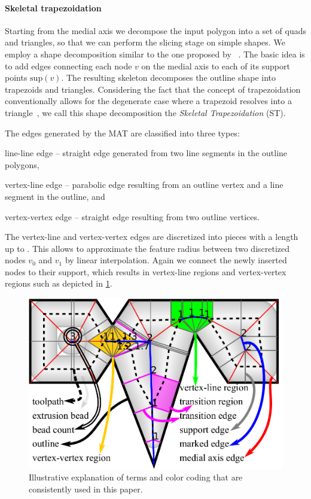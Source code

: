 \paragraph{Skeletal trapezoidation}
Starting from the medial axis we decompose the input polygon into a set of quads and triangles, so that we can perform the slicing stage on simple shapes.
We employ a shape decomposition similar to the one proposed by \citeauthor{Ding2016a}~\cite{Ding2016a}. 
The basic idea is to add edges connecting each node $v$ on the medial axis to each of its support points $\text{sup}(v)$. 
The resulting skeleton decomposes the outline shape into trapezoids and triangles.
Considering the fact that the concept of trapezoidation conventionally allows for the degenerate case where a trapezoid resolves into a triangle~\cite{chazelle1984,fournier1984}, we call this shape decomposition the \emph{Skeletal Trapezoidation} (ST).


The edges generated by the MAT are classified into three types:
\begin{enumerate*}
\item line-line edge -- straight edge generated from two line segments in the outline polygons,
\item vertex-line edge -- parabolic edge resulting from an outline vertex and a line segment in the outline, and 
\item vertex-vertex edge -- straight edge resulting from two outline vertices.
\end{enumerate*}
The vertex-line and vertex-vertex edges are discretized into pieces with a length up to .
This allows to approximate the feature radius between two discretized nodes $v_0$ and $v_1$ by linear interpolation. 
Again we connect the newly inserted nodes to their support, which results in vertex-line regions and vertex-vertex regions such as depicted in \cref{legend}.



\begin{figure}\centering
\includegraphics[width=.75\columnwidth]{sources-method-legend2.pdf}
\caption{Illustrative explanation of terms and color coding that are consistently used in this paper.}
\label{legend}
\end{figure}




